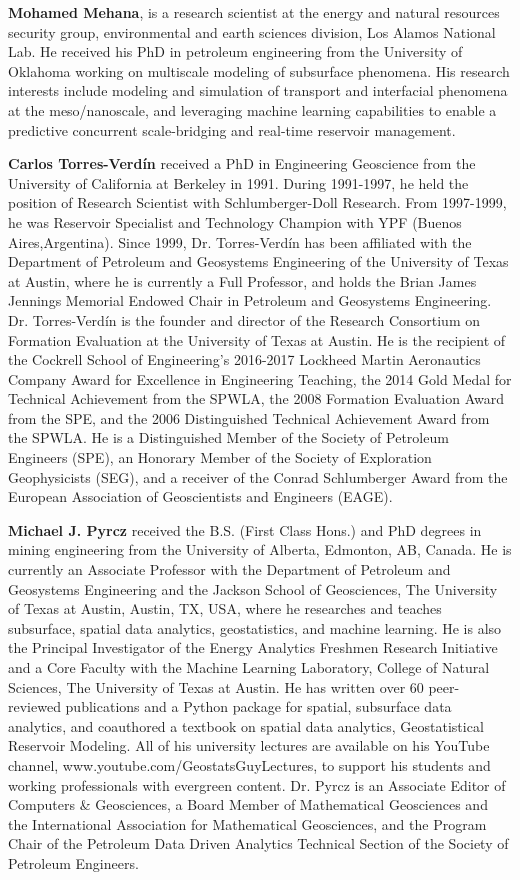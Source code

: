 \documentclass[a4paper,fleqn]{cas-sc}
\begin{document}
\bio{}
{\bf Mohamed Mehana}, is a research scientist at the energy and natural resources security group, environmental and earth sciences division, Los Alamos National Lab. He received his PhD in petroleum engineering from the University of Oklahoma working on multiscale modeling of subsurface phenomena. His research interests include modeling and simulation of transport and interfacial phenomena at the meso/nanoscale, and leveraging machine learning capabilities to enable a predictive concurrent scale-bridging and real-time reservoir management.
\endbio

\bio{}
{\bf Carlos Torres-Verd\'in} received a PhD in Engineering Geoscience from the University of California at Berkeley in 1991. During 1991-1997, he held the position of Research Scientist with Schlumberger-Doll Research. From 1997-1999, he was Reservoir Specialist and Technology Champion with YPF (Buenos Aires,Argentina). Since 1999, Dr. Torres-Verd\'in has been affiliated with the Department of Petroleum and Geosystems Engineering of the University of Texas at Austin, where he is currently a Full Professor, and holds the Brian James Jennings Memorial Endowed Chair in Petroleum and Geosystems Engineering. Dr. Torres-Verd\'in is the founder and director of the Research Consortium on Formation Evaluation at the University of Texas at Austin. He is the recipient of the Cockrell School of Engineering’s 2016-2017 Lockheed Martin Aeronautics Company Award for Excellence in Engineering Teaching, the 2014 Gold Medal for Technical Achievement from the SPWLA, the 2008 Formation Evaluation Award from the SPE, and the 2006 Distinguished Technical Achievement Award from the SPWLA. He is a Distinguished Member of the Society of Petroleum Engineers (SPE), an Honorary Member of the Society of Exploration Geophysicists (SEG), and a receiver of the Conrad Schlumberger Award from the European Association of Geoscientists and Engineers (EAGE).
\endbio

\bio{}
{\bf Michael J. Pyrcz} received the B.S. (First Class Hons.) and PhD degrees in mining engineering
from the University of Alberta, Edmonton, AB, Canada. He is currently an Associate Professor with the Department of Petroleum and Geosystems Engineering and the Jackson School of Geosciences, The University of Texas at Austin, Austin, TX, USA, where he researches and teaches subsurface, spatial data analytics, geostatistics, and machine learning. He is also the Principal Investigator of the Energy Analytics Freshmen Research Initiative and a Core Faculty with the Machine Learning Laboratory, College of Natural Sciences, The University of Texas at Austin. He has written over 60 peer-reviewed publications and a Python package for spatial, subsurface data analytics, and coauthored a textbook on spatial data analytics, Geostatistical Reservoir Modeling. All of his university lectures are available on his YouTube channel, www.youtube.com/GeostatsGuyLectures, to support his students and working professionals with evergreen content. Dr. Pyrcz is an Associate Editor of Computers \& Geosciences, a Board Member of Mathematical Geosciences and the International Association for Mathematical Geosciences, and the Program Chair of the Petroleum Data Driven Analytics Technical Section of the Society of Petroleum Engineers.
\endbio
\end{document}
